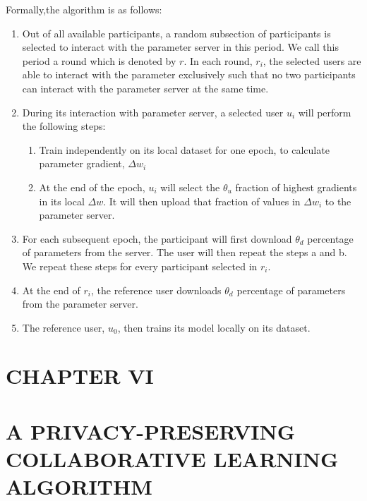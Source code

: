 \documentclass[letterpaper]{article}
\begin{document}
\begin{flushleft}
{Formally,the algorithm is as follows:
\begin {enumerate}
\item Out of all available participants, a random subsection of participants is selected to interact with the parameter server in this
period. We call this period a round which is denoted by $r$. In each round, $r_i$, the selected users are able to interact with the parameter exclusively such that no two
participants can interact with the parameter server at the same time.
\item During its interaction with parameter server, a selected user $u_i$ will perform the following steps:
\begin {enumerate}
  \item Train independently on its local dataset for one epoch, to calculate parameter gradient, $\Delta w_i$ 
  \item  At the end of the epoch, $u_i$ will select the $\theta_u$ fraction of highest gradients in its local $\Delta w$. It will then upload that fraction of values in $\Delta w_i$ to the parameter server.
  \end {enumerate}
\item For each subsequent epoch, the participant will first download $\theta_d$ percentage of parameters from the server. The
user will then repeat the steps a and b. We repeat these steps for every participant selected in $r_i$.
\item At the end of $r_i$, the reference user downloads $\theta_d$ percentage of parameters from the parameter server.
\item The reference user, $u_0$, then trains its model locally on its dataset. 
\end {enumerate}



\pagebreak
\section*{CHAPTER VI}
\vspace{0.25in}
\section{A PRIVACY-PRESERVING COLLABORATIVE LEARNING ALGORITHM}
}
\end{flushleft}
\end{document}
